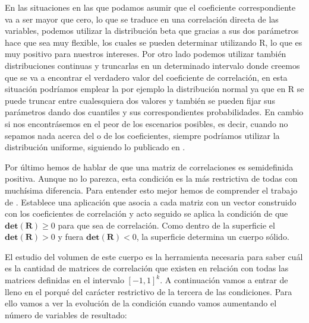 \documentclass[a4paper,openright,12pt]{report}
\begin{document}
En las situaciones en las que podamos asumir que el coeficiente correspondiente va a ser mayor que cero, lo que se traduce en una correlación directa de las variables, podemos utilizar la distribución beta que gracias a sus dos parámetros hace que sea muy flexible, los cuales se pueden determinar utilizando R, lo que es muy positivo para nuestros intereses. Por otro lado podemos utilizar también distribuciones continuas y truncarlas en un determinado intervalo donde creemos que se va a encontrar el verdadero valor del coeficiente de correlación, en esta situación podríamos emplear la por ejemplo la distribución normal ya que en R se puede truncar entre cualesquiera dos valores y también se pueden fijar sus parámetros dando dos cuantiles y sus correspondientes probabilidades. En cambio si nos encontrásemos en el peor de los escenarios posibles, es decir, cuando no sepamos nada acerca del o de los coeficientes, siempre podríamos utilizar la distribución uniforme, siguiendo lo publicado en \cite{Barnard2000}.

Por último hemos de hablar de que una matriz de correlaciones es semidefinida positiva. Aunque no lo parezca, esta condición es la más restrictiva de todas con muchísima diferencia. Para entender esto mejor hemos de comprender el trabajo de \cite{Rousseeuw1994}. Establece una aplicación que asocia a cada matriz con un vector construido con los coeficientes de correlación y acto seguido se aplica la condición de que $\mathbf{det}(\mathbf{R})\geq 0$ para que sea de correlación. Como dentro de la superficie el $\mathbf{det}(\mathbf{R})> 0$ y fuera $\mathbf{det}(\mathbf{R})< 0$, la superficie determina un cuerpo sólido.

El estudio del volumen de este cuerpo es la herramienta necesaria para saber cuál es la cantidad de matrices de correlación que existen en relación con todas las matrices definidas en el intervalo $[-1,1]^{k}$. A continuación vamos a entrar de lleno en el porqué del carácter restrictivo de la tercera de las condiciones. Para ello vamos a ver la evolución de la condición cuando vamos aumentando el número de variables de resultado:
\end{document}
